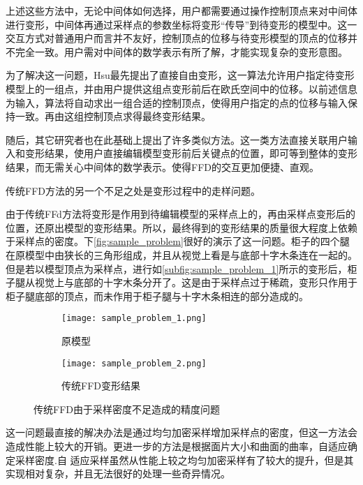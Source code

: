 上述这些方法中，无论中间体如何选择，用户都需要通过操作控制顶点来对中间体进行变形，中间体再通过采样点的参数坐标将变形“传导”到待变形的模型中。这一交互方式对普通用户而言并不友好，控制顶点的位移与待变形模型的顶点的位移并不完全一致。用户需对中间体的数学表示有所了解，才能实现复杂的变形意图。

为了解决这一问题，Hsu\cite{hsu1992}最先提出了直接自由变形，这一算法允许用户指定待变形模型上的一组点，并由用户提供这组点变形前后在欧氏空间中的位移。以前述信息为输入，算法将自动求出一组合适的控制顶点，使得用户指定的点的位移与输入保持一致。再由这组控制顶点求得最终变形结果。

随后，其它研究者也在此基础上提出了许多类似方法。这一类方法直接关联用户输入和变形结果，使用户直接编辑模型变形前后关键点的位置，即可等到整体的变形结果，而无需关心中间体的数学表示。使得FFD的交互更加便捷、直观。

传统FFD方法的另一个不足之处是变形过程中的走样问题。

由于传统FFd方法将变形是作用到待编辑模型的采样点上的，再由采样点变形后的位置，还原出模型的变形结果。所以，最终得到的变形结果的质量很大程度上依赖于采样点的密度。下\autoref{fig:sample_problem}很好的演示了这一问题。柜子的四个腿在原模型中由狭长的三角形组成，并且从视觉上看是与底部十字木条连在一起的。但是若以模型顶点为采样点，进行如\autoref{subfig:sample_problem_1}所示的变形后，柜子腿从视觉上与底部的十字木条分开了。这是由于采样点过于稀疏，变形只作用于柜子腿底部的顶点，而未作用于柜子腿与十字木条相连的部分造成的。

\begin{figure}[htbp]
	\centering
	\begin{subfigure}[b]{.4\textwidth}
		\centering
		\texttt{[image: sample\_problem\_1.png]}
		\caption{原模型}\label{subfig:sample_problem_0}
	\end{subfigure}
	\quad
	\begin{subfigure}[b]{.4\textwidth}
		\centering
		\texttt{[image: sample\_problem\_2.png]}
		\caption{传统FFD变形结果}\label{subfig:sample_problem_1}
	\end{subfigure}
    \caption{传统FFD由于采样密度不足造成的精度问题}\label{fig:sample_problem}
\end{figure}

这一问题最直接的解决办法是通过均匀加密采样增加采样点的密度，但这一方法会造成性能上较大的开销。更进一步的方法\cite{parry1986, gain1999}是根据面片大小和曲面的曲率，自适应确定采样密度.自
适应采样虽然从性能上较之均匀加密采样有了较大的提升，但是其实现相对复杂，并且无法很好的处理一些奇异情况。

